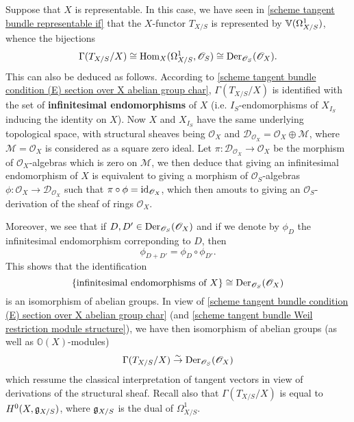 Suppose that $X$ is representable. In this case, we have seen in \cref{scheme tangent bundle representable if} that the $X$-functor $T_{X/S}$ is represented by $\mathbb{V}(\Omega_{X/S}^1)$, whence the bijections
\begin{equation}\label{scheme group representable tangent bundle section and derivation}
\Gamma(T_{X/S}/X)\cong\mathrm{Hom}_X(\Omega_{X/S}^1,\mathscr{O}_S)\cong\mathrm{Der}_{\mathscr{O}_S}(\mathscr{O}_X).
\end{equation}
This can also be deduced as follows. According to \cref{scheme tangent bundle condition (E) section over X abelian group char}, $\Gamma(T_{X/S}/X)$ is identified with the set of \textbf{infinitesimal endomorphisms} of $X$ (i.e. $I_S$-endomorphisms of $X_{I_S}$ inducing the identity on $X$). Now $X$ and $X_{I_S}$ have the same underlying topological space, with structural sheaves being $\mathscr{O}_X$ and $\mathscr{D}_{\mathscr{O}_X}=\mathscr{O}_X\oplus\mathscr{M}$, where $\mathscr{M}=\mathscr{O}_X$ is considered as a square zero ideal. Let $\pi:\mathscr{D}_{\mathscr{O}_X}\to\mathscr{O}_X$ be the morphism of $\mathscr{O}_X$-algebras which is zero on $\mathscr{M}$, we then deduce that giving an infinitesimal endomorphism of $X$ is equivalent to giving a morphism of $\mathscr{O}_S$-algebras $\phi:\mathscr{O}_X\to\mathscr{D}_{\mathscr{O}_X}$ such that $\pi\circ\phi=\operatorname{id}_{\mathscr{O}_X}$, which then amouts to giving an $\mathscr{O}_S$-derivation of the sheaf of rings $\mathscr{O}_X$.\par
Moreover, we see that if $D,D'\in\mathrm{Der}_{\mathscr{O}_S}(\mathscr{O}_X)$ and if we denote by $\phi_D$ the infinitesimal endomorphism correponding to $D$, then
\[\phi_{D+D'}=\phi_{D}\circ\phi_{D'}.\]
This shows that the identification
\[\{\text{infinitesimal endomorphisms of $X$}\}\cong\mathrm{Der}_{\mathscr{O}_S}(\mathscr{O}_X)\]
is an isomorphism of abelian groups. In view of \cref{scheme tangent bundle condition (E) section over X abelian group char} (and \cref{scheme tangent bundle Weil restriction module structure}), we have then isomorphism of abelian groups (as well as $\mathbb{O}(X)$-modules)
\[\Gamma(T_{X/S}/X)\stackrel{\sim}{\to} \mathrm{Der}_{\mathscr{O}_S}(\mathscr{O}_X)\]
which ressume the classical interpretation of tangent vectors in view of derivations of the structural sheaf. Recall also that $\Gamma(T_{X/S}/X)$ is equal to $H^0(X,\mathfrak{g}_{X/S})$, where $\mathfrak{g}_{X/S}$ is the dual of $\Omega_{X/S}^1$.

